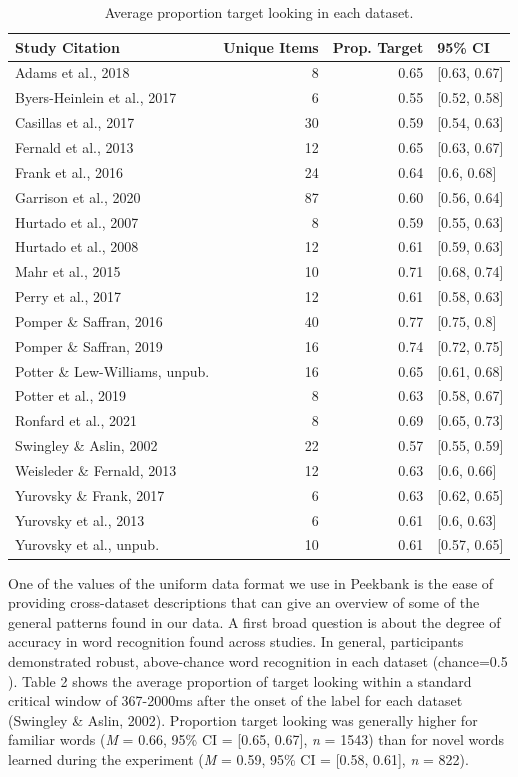 \documentclass[
  english,
  man,floatsintext]{apa6}
\providecommand{\DIFaddtex}[1]{{\protect\color{blue}{#1}}} %
\providecommand{\DIFaddbegin}{} %
\providecommand{\DIFaddend}{} %
\providecommand{\DIFadd}[1]{\texorpdfstring{\DIFaddtex{#1}}{#1}} %
\newcommand{\DIFaddincludegraphics}[2][]{{\color{blue}\fbox{\DIFOincludegraphics[#1]{#2}}}} %
\DeclareRobustCommand{\DIFaddbegin}{\DIFOaddbegin \let\includegraphics\DIFaddincludegraphics} %
\DeclareRobustCommand{\DIFaddend}{\DIFOaddend \let\includegraphics\DIFOincludegraphics} %
\begin{document}
\begin{table}[H]
\centering
\begingroup\fontsize{9pt}{10pt}\selectfont
\begin{tabular}{lrrl}
  \hline
Study Citation & Unique Items & Prop. Target & 95\% CI \\ 
  \hline
Adams et al., 2018 & 8 & 0.65 & [0.63, 0.67] \\ 
  Byers-Heinlein et al., 2017 & 6 & 0.55 & [0.52, 0.58] \\ 
  Casillas et al., 2017 & 30 & 0.59 & [0.54, 0.63] \\ 
  Fernald et al., 2013 & 12 & 0.65 & [0.63, 0.67] \\ 
  Frank et al., 2016 & 24 & 0.64 & [0.6, 0.68] \\ 
  Garrison et al., 2020 & 87 & 0.60 & [0.56, 0.64] \\ 
  Hurtado et al., 2007 & 8 & 0.59 & [0.55, 0.63] \\ 
  Hurtado et al., 2008 & 12 & 0.61 & [0.59, 0.63] \\ 
  Mahr et al., 2015 & 10 & 0.71 & [0.68, 0.74] \\ 
  Perry et al., 2017 & 12 & 0.61 & [0.58, 0.63] \\ 
  Pomper \& Saffran, 2016 & 40 & 0.77 & [0.75, 0.8] \\ 
  Pomper \& Saffran, 2019 & 16 & 0.74 & [0.72, 0.75] \\ 
  Potter \& Lew-Williams, unpub. & 16 & 0.65 & [0.61, 0.68] \\ 
  Potter et al., 2019 & 8 & 0.63 & [0.58, 0.67] \\ 
  Ronfard et al., 2021 & 8 & 0.69 & [0.65, 0.73] \\ 
  Swingley \& Aslin, 2002 & 22 & 0.57 & [0.55, 0.59] \\ 
  Weisleder \& Fernald, 2013 & 12 & 0.63 & [0.6, 0.66] \\ 
  Yurovsky \& Frank, 2017 & 6 & 0.63 & [0.62, 0.65] \\ 
  Yurovsky et al., 2013 & 6 & 0.61 & [0.6, 0.63] \\ 
  Yurovsky et al., unpub. & 10 & 0.61 & [0.57, 0.65] \\ 
   \hline
\end{tabular}
\endgroup
\caption{Average proportion target looking in each dataset.} 
\end{table}

One of the values of the uniform data format we use in Peekbank is the ease of providing cross-dataset descriptions that can give an overview of some of the general patterns found in our data.
A first broad question is about the degree of accuracy in word recognition found across studies.
In general, participants demonstrated robust, above-chance word recognition in each dataset (chance=0.5 \DIFaddbegin \DIFadd{due to the two-alternative forced-choice design of looking-while-listening trials}\DIFaddend ).
Table 2 shows the average proportion of target looking within a standard critical window of 367-2000ms after the onset of the label for each dataset (Swingley \& Aslin, 2002).
Proportion target looking was generally higher for familiar words (\emph{M} = 0.66, 95\% CI = {[}0.65, 0.67{]}, \emph{n} = 1543) than for novel words learned during the experiment (\emph{M} = 0.59, 95\% CI = {[}0.58, 0.61{]}, \emph{n} = 822).
\end{document}
